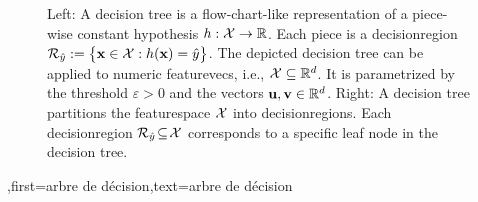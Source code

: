 {{\begin{figure}[H]
\begin{minipage}{.45\textwidth}
{	}
\end{minipage}	
\hspace*{15mm}
\begin{minipage}{.45\textwidth}
	\hspace*{15mm}
\end{minipage}
	\caption{Left: A decision tree is a flow-chart-like representation of a piece-wise constant \gls{hypothesis} $h: \mathcal{X} \rightarrow \mathbb{R}$.  Each piece is a \gls{decisionregion} $\mathcal{R}_{\hat{y}} := \big\{ {\bf x} \in  \mathcal{X}: h({\bf x}) = \hat{y} \big\}$. 
		The depicted decision tree can be applied to numeric \gls{featurevec}s, i.e., $\mathcal{X} \subseteq \mathbb{R}^{d}$. It is  parametrized by the threshold $\varepsilon>0$ and the vectors ${\bf u}, {\bf v} \in \mathbb{R}^{d}$. 
		Right: A decision tree partitions  
		the \gls{featurespace} $\mathcal{X}$ into \gls{decisionregion}s. Each \gls{decisionregion}  
		$\mathcal{R}_{\hat{y}} \!\subseteq\!\mathcal{X}$ corresponds to a specific leaf node in the decision tree.}
	\label{fig_decision_tree}
\end{figure} 
	  }
	  ,first={arbre de décision},text={arbre de décision} }



